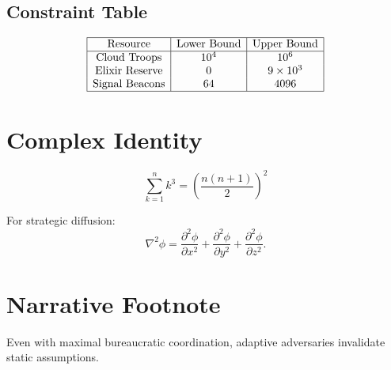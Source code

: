 \documentclass{article}
\begin{document}
\subsection{Constraint Table}
\[
\begin{array}{|c|c|c|}
\hline
\text{Resource} & \text{Lower Bound} & \text{Upper Bound} \\
\hline
\text{Cloud Troops} & 10^4 & 10^6 \\
\text{Elixir Reserve} & 0 & 9\times 10^3 \\
\text{Signal Beacons} & 64 & 4096 \\
\hline
\end{array}
\]

\section{Complex Identity}
\[
\sum_{k=1}^{n} k^3 = \left(\frac{n(n+1)}{2}\right)^2
\]

For strategic diffusion:
\[
\nabla^2 \phi = \frac{\partial^2 \phi}{\partial x^2} + \frac{\partial^2 \phi}{\partial y^2} + \frac{\partial^2 \phi}{\partial z^2}.
\]

\section{Narrative Footnote}
Even with maximal bureaucratic coordination, adaptive adversaries invalidate static assumptions.
\end{document}
